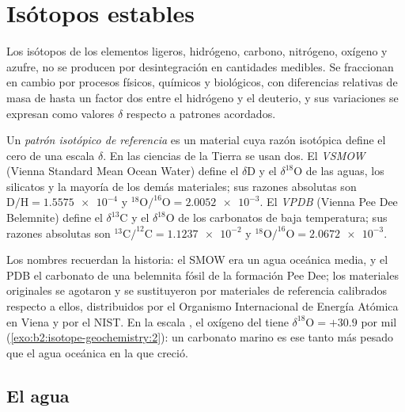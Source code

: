 \section{Isótopos estables}

Los isótopos de los elementos ligeros, hidrógeno, carbono, nitrógeno, oxígeno y
azufre, no se producen por desintegración en cantidades medibles. Se fraccionan
en cambio por procesos físicos, químicos y biológicos, con diferencias relativas de masa
de hasta un factor dos entre el hidrógeno y el deuterio, y sus
variaciones se expresan como valores $\delta$ respecto a patrones acordados.

\begin{definition}\label{def:b2:isotope-geochemistry:standards}
Un \emph{patrón isotópico de referencia} es un
material cuya razón isotópica define el cero de una escala $\delta$. En las ciencias de la Tierra
se usan dos. El \emph{VSMOW} (Vienna Standard Mean Ocean
Water) define el $\delta\mathrm{D}$ y el $\delta^{18}\mathrm{O}$ de las aguas, los silicatos y
la mayoría de los demás materiales; sus razones absolutas son $\mathrm{D}/\mathrm{H} =
\num{1.5575e-4}$ y $^{18}\mathrm{O}/^{16}\mathrm{O} = \num{2.0052e-3}$.
El \emph{VPDB} (Vienna Pee Dee Belemnite) define el $\delta^{13}\mathrm{C}$
y el $\delta^{18}\mathrm{O}$ de los carbonatos de baja temperatura; sus razones absolutas
son $^{13}\mathrm{C}/^{12}\mathrm{C} = \num{1.1237e-2}$ y
$^{18}\mathrm{O}/^{16}\mathrm{O} = \num{2.0672e-3}$.
\end{definition}

Los nombres recuerdan la historia: el SMOW era un agua oceánica media, y el PDB el
carbonato de una belemnita fósil de la formación Pee Dee; los materiales originales
se agotaron y se sustituyeron por materiales de referencia calibrados respecto a ellos,
distribuidos por el Organismo Internacional de Energía Atómica en Viena y por el NIST.
En la escala , el oxígeno del  tiene $\delta^{18}\mathrm{O} = +30.9$ por mil
(\cref{exo:b2:isotope-geochemistry:2}): un carbonato marino es ese tanto más pesado que el agua oceánica en la que
creció.

\subsection{El agua}

